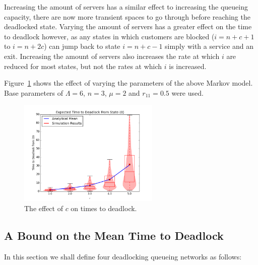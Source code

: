 \documentclass{article}
\begin{document}
Increasing the amount of servers has a similar effect to increasing the queueing capacity, there are now more transient spaces to go through before reaching the deadlocked state.
Varying the amount of servers has a greater effect on the time to deadlock however, as any states in which customers are blocked ($i=n+c+1$ to $i=n+2c$) can jump back to state $i=n+c-1$ simply with a service and an exit.
Increasing the amount of servers also increases the rate at which $i$ are reduced for most states, but not the rates at which $i$ is increased.

Figure~\ref{fig:timestodeadlock1nodemultiserver} shows the effect of varying the parameters of the above Markov model.
Base parameters of $\Lambda = 6$, $n = 3$, $\mu = 2$ and $r_{11} = 0.5$ were used.

\begin{figure}
  \begin{center}
  \includegraphics[width=0.6\textwidth]{images/vary_c_1Nms}
  \caption{The effect of $c$ on times to deadlock.}
  \label{fig:timestodeadlock1nodemultiserver}
  \end{center}
\end{figure}


\subsection{A Bound on the Mean Time to Deadlock}
In this section we shall define four deadlocking queueing networks as follows:
\end{document}
